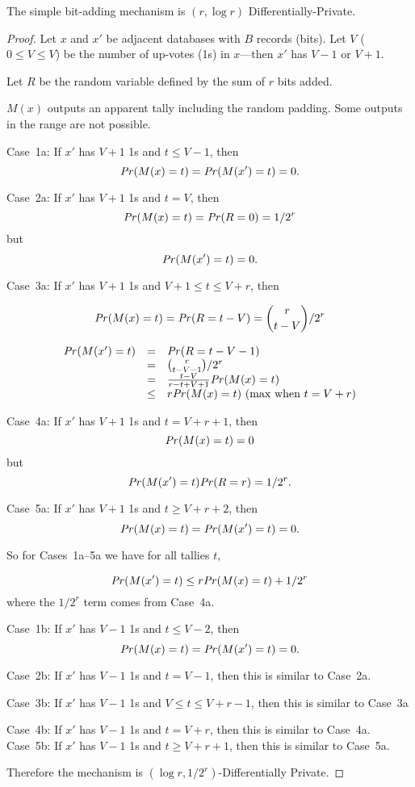 \documentclass[10pt,a4paper]{article}
\begin{document}
\begin{prop}
The simple bit-adding mechanism is $(r, \log r)$ Differentially-Private.
\end{prop}
\begin{proof}
Let $x$ and $x'$ be adjacent databases with $B$ records (bits). Let $V$ ($0 \leq V \leq V$) be the number of up-votes (1s) in $x$---then $x'$ has $V-1$ or $V+1$.

Let $R$ be the random variable defined by the sum of $r$ bits added.

$M(x)$ outputs an apparent tally including the random padding. Some outputs in the range are not possible.

Case~1a: If $x'$ has $V+1$ 1s and $t \leq V-1$, then 
$$\mathit{Pr}(M(x) = t) = \mathit{Pr}(M(x')=t) = 0.$$


Case~2a: If $x'$ has $V+1$ 1s and $t = V$, then
$$\mathit{Pr}(M(x) = t) = \mathit{Pr}(R = 0) = 1 / 2^r$$ 
but
$$\mathit{Pr}(M(x') = t) = 0.$$ 

Case~3a: If $x'$ has $V+1$ 1s and $V+1 \leq t \leq V+r$, then 

$$\mathit{Pr}(M(x) = t) = \mathit{Pr}(R = t-V) = {r \choose {t-V}} / 2^r$$ 

$$
\begin{array}{rcl}
\mathit{Pr}(M(x') = t) & = & \mathit{Pr}(R = t-V-1) \\
				 & = & {r \choose {t-V-1}} / 2^r \\
				 & = & \frac{t-V}{r-t+V+1}     \mathit{Pr}(M(x) = t) \\
				 & \leq & r \mathit{Pr}(M(x) = t)  \text{       (max when $t=V+r$)}
\end{array}
$$

Case~4a: If $x'$ has $V+1$ 1s and $t = V+r+1$, then 
$$\mathit{Pr}(M(x) = t) = 0 $$
but
$$\mathit{Pr}(M(x') = t)  \mathit{Pr}(R = r) = 1 / 2^r.$$ 

Case~5a: If $x'$ has $V+1$ 1s and $t \geq V+r+2$, then 
$$\mathit{Pr}(M(x) = t) = \mathit{Pr}(M(x')=t) = 0.$$

So for Cases~1a--5a we have for all tallies $t$,

$$\mathit{Pr}(M(x') = t) \leq r \mathit{Pr}(M(x) = t) + 1/2^r$$  where the $1/2^r$ term comes from Case~4a.

Case~1b: If $x'$ has $V-1$ 1s and $t \leq V-2$, then 
$$\mathit{Pr}(M(x) = t) = \mathit{Pr}(M(x')=t) = 0.$$

Case~2b: If $x'$ has $V-1$ 1s and $t=V-1$, then this is similar to Case~2a.

Case~3b: If $x'$ has $V-1$ 1s and $V \leq t \leq V+r-1$, then this is similar to Case~3a

Case~4b: If $x'$ has $V-1$ 1s and $t = V+r$, then this is similar to Case~4a.
Case~5b: If $x'$ has $V-1$ 1s and $t \geq V+r+1$, then this is similar to Case~5a.

Therefore the mechanism is $(\log r, 1/2^r)$-Differentially Private.
\end{proof}
\end{document}

